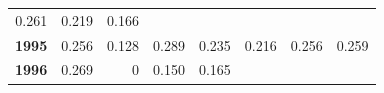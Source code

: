 \documentclass[]{article}
\begin{document}
\begin{longtable}[]{@{}rrrrrrrr@{}}
\begin{minipage}[t]{0.09\columnwidth}
0.261\strut
\end{minipage} & \begin{minipage}[t]{0.08\columnwidth}\raggedleft\strut
0.219\strut
\end{minipage} & \begin{minipage}[t]{0.10\columnwidth}\raggedleft\strut
0.166\strut
\end{minipage}\tabularnewline
\begin{minipage}[t]{0.08\columnwidth}\raggedleft\strut
\textbf{1995}\strut
\end{minipage} & \begin{minipage}[t]{0.10\columnwidth}\raggedleft\strut
0.256\strut
\end{minipage} & \begin{minipage}[t]{0.11\columnwidth}\raggedleft\strut
0.128\strut
\end{minipage} & \begin{minipage}[t]{0.08\columnwidth}\raggedleft\strut
0.289\strut
\end{minipage} & \begin{minipage}[t]{0.14\columnwidth}\raggedleft\strut
0.235\strut
\end{minipage} & \begin{minipage}[t]{0.09\columnwidth}\raggedleft\strut
0.216\strut
\end{minipage} & \begin{minipage}[t]{0.08\columnwidth}\raggedleft\strut
0.256\strut
\end{minipage} & \begin{minipage}[t]{0.10\columnwidth}\raggedleft\strut
0.259\strut
\end{minipage}\tabularnewline
\begin{minipage}[t]{0.08\columnwidth}\raggedleft\strut
\textbf{1996}\strut
\end{minipage} & \begin{minipage}[t]{0.10\columnwidth}\raggedleft\strut
0.269\strut
\end{minipage} & \begin{minipage}[t]{0.11\columnwidth}\raggedleft\strut
0\strut
\end{minipage} & \begin{minipage}[t]{0.08\columnwidth}\raggedleft\strut
0.150\strut
\end{minipage} & \begin{minipage}[t]{0.14\columnwidth}\raggedleft\strut
0.165\strut
\end{minipage} & \begin{minipage}[t]{0.09\columnwidth}\raggedleft\strut

\end{minipage}
\end{longtable}
\end{document}

